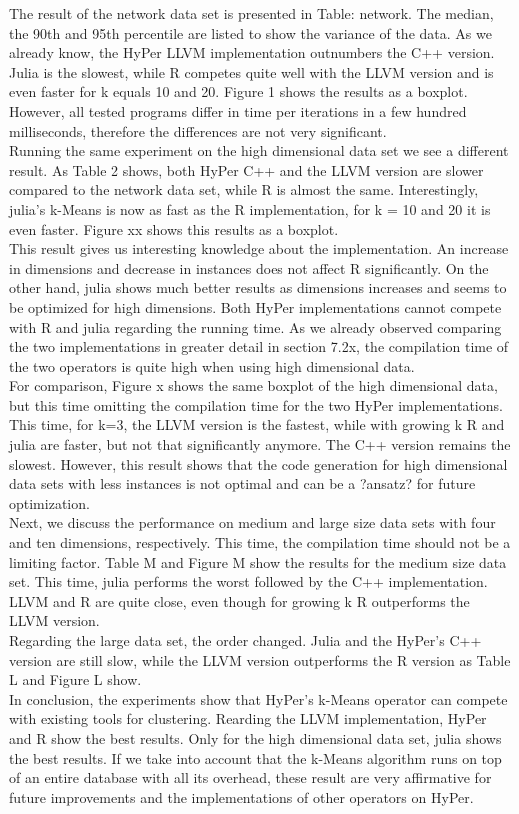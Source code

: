 The result of the network data set is presented in Table: network. The median, the 90th and 95th percentile are listed to show the variance of the data. As we already know, the HyPer LLVM implementation outnumbers  the C++ version. Julia is the slowest, while R competes quite well with the LLVM version and is even faster for k equals 10 and 20. Figure 1 shows the results as a boxplot.
However, all tested programs differ in time per iterations in a few hundred milliseconds, therefore the differences are not very significant.
\\
Running the same experiment on the high dimensional data set we see a different result. As Table 2 shows, both HyPer C++ and the LLVM version are slower compared to the network data set, while R is almost the same. Interestingly, julia’s k-Means is now as fast as the R implementation, for k = 10 and 20 it is even faster. Figure xx shows this results as a boxplot. 
\\
This result gives us interesting knowledge about the implementation. An increase in dimensions and decrease in instances does not affect R significantly. On the other hand, julia shows much better results as dimensions increases and seems to be optimized for high dimensions. Both HyPer implementations cannot compete with R and julia regarding the running time. As we already observed comparing the two implementations in greater detail in section 7.2x, the compilation time of the two operators is quite high when using high dimensional data.
\\
For comparison, Figure x shows the same boxplot of the high dimensional data, but this time omitting the compilation time for the two HyPer implementations. This time, for k=3, the LLVM version is the fastest, while with growing k R and julia are faster, but not that significantly anymore. The C++ version remains the slowest. However, this result shows that the code generation for high dimensional data sets with less instances is not optimal and can be a ?ansatz? for future optimization.
\\
Next, we discuss the performance on medium and large size data sets with four and ten dimensions, respectively. This time, the compilation time should not be a limiting factor. Table M and Figure M show the results for  the medium size data set. This time, julia performs the worst followed by the C++ implementation. LLVM and R are quite close, even though for growing k R outperforms the LLVM version. 
\\
Regarding the large data set, the order changed. Julia and the HyPer’s C++ version are still slow, while the LLVM version outperforms the R version as Table L and Figure L show.
\\
In conclusion, the experiments show that HyPer’s k-Means operator can compete with existing tools for clustering. Rearding the LLVM implementation, HyPer and R show the best results. Only for the high dimensional data set, julia shows the best results. If we take into account that the k-Means algorithm runs on top of an entire database with all its overhead, these result are very affirmative for future improvements and the implementations of other operators on HyPer.


